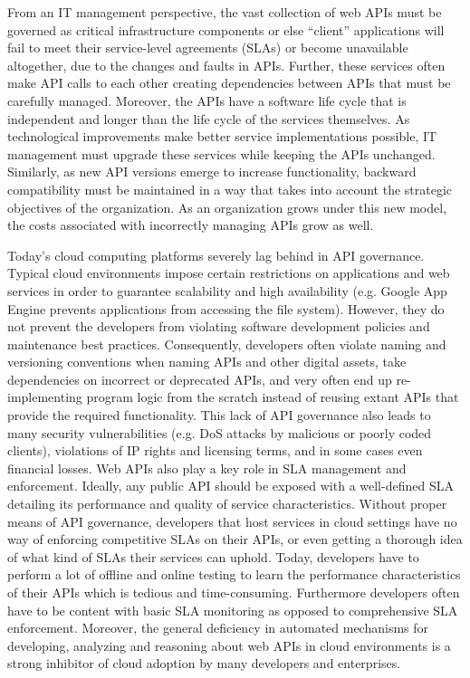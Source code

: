 \documentclass[10pt]{article}
\begin{document}
From an IT management perspective, the vast collection of web APIs must be
governed as critical infrastructure components or else ``client'' applications
will fail to meet their service-level agreements (SLAs)
or become unavailable altogether, due to the changes and faults in APIs.  
Further, these services often make API calls to each other 
creating dependencies between APIs that must be carefully managed.
Moreover, the APIs have a software life cycle that is
independent and longer than the life cycle of the services themselves. 
As technological improvements make better service implementations possible, IT
management must upgrade these services while keeping the APIs unchanged.
Similarly, as new API versions emerge to increase functionality, backward
compatibility must be maintained in a way that takes into
account the strategic objectives of the organization.  As an organization
grows under this new model, the costs associated with
incorrectly managing APIs grow as well.

Today's cloud computing platforms severely lag behind in 
API governance. Typical cloud environments impose certain restrictions
on applications and web services in order to guarantee scalability
and high availability (e.g. Google App Engine prevents applications from accessing
the file system). 
However, they do not prevent the developers from violating
software development policies and maintenance best practices. 
Consequently, developers often violate naming and versioning conventions
when naming APIs and other digital assets, take dependencies
on incorrect or deprecated APIs, and very often end up re-implementing program logic
from the scratch instead of reusing extant APIs that provide the required functionality.
This lack of API governance also leads to many security vulnerabilities (e.g. DoS attacks
by malicious or poorly coded clients), violations of IP rights and licensing terms, and in
some cases even financial losses. Web APIs also play a key role in SLA
management and enforcement. Ideally, any public API should be exposed with a well-defined
SLA detailing its performance and quality of service characteristics. Without proper means
of API governance, developers that host services in cloud settings have no way of enforcing
competitive SLAs on their APIs, or even getting a thorough idea of what kind of SLAs
their services can uphold. Today, developers have to perform a lot of offline
and online testing to learn the performance characteristics of their APIs which is tedious and
time-consuming. Furthermore developers often have to be content with basic SLA monitoring 
as opposed to comprehensive SLA enforcement. Moreover, the general deficiency in
automated mechanisms for developing, analyzing and reasoning 
about web APIs in cloud environments
is a strong inhibitor of cloud adoption by many developers and enterprises.
\end{document}
